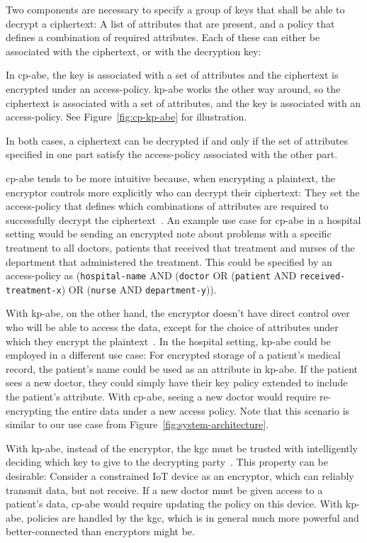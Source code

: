 Two components are necessary to specify a group of keys that shall be able to decrypt a ciphertext:
A list of attributes that are present, and a policy that defines a combination of required attributes. 
Each of these can either be associated with the ciphertext, or with the decryption key:

In \acrfull{cp-abe}, the key is associated with a set of attributes and the ciphertext is encrypted under an \gls{access-policy}.
\acrfull{kp-abe} works the other way around, so the ciphertext is associated with a set of attributes, and the key is associated with an \gls{access-policy}.
See Figure~\ref{fig:cp-kp-abe} for illustration.

In both cases, a ciphertext can be decrypted if and only if the set of attributes specified in one part satisfy the \gls{access-policy} associated with the other part.

\acrshort{cp-abe} tends to be more intuitive because, when encrypting a plaintext, the encryptor controls more explicitly who can decrypt their ciphertext:
They set the \gls{access-policy} that defines which combinations of attributes are required to successfully decrypt the ciphertext~\cite{bethencourt_ciphertext-policy_2007}.
An example use case for \acrshort{cp-abe} in a hospital setting would be sending an encrypted note about problems with a specific treatment to all doctors, patients that received that treatment and nurses of the department that administered the treatment.
This could be specified by an \gls{access-policy} as (\texttt{hospital-name} AND (\texttt{doctor} OR (\texttt{patient} AND \texttt{received-treatment-x}) OR (\texttt{nurse} AND \texttt{department-y})).

With \acrshort{kp-abe}, on the other hand, the encryptor doesn't have direct control over who will be able to access the data, except for the choice of attributes under which they encrypt the plaintext~\cite{bethencourt_ciphertext-policy_2007}.
In the hospital setting, \acrshort{kp-abe} could be employed in a different use case: For encrypted storage of a patient's medical record, the patient's name could be used as an attribute in \acrshort{kp-abe}.
If the patient sees a new doctor, they could simply have their key policy extended to include the patient's attribute.
With \acrshort{cp-abe}, seeing a new doctor would require re-encrypting the entire data under a new access policy.
Note that this scenario is similar to our use case from Figure~\ref{fig:system-architecture}.

With \acrshort{kp-abe}, instead of the encryptor, the \acrlong{kgc} must be trusted with intelligently deciding which key to give to the decrypting party~\cite{bethencourt_ciphertext-policy_2007}.
This property can be desirable: Consider a constrained IoT device as an encryptor, which can reliably transmit data, but not receive.
If a new doctor must be given access to a patient's data, \acrshort{cp-abe} would require updating the policy on this device.
With \acrshort{kp-abe}, policies are handled by the \acrshort{kgc}, which is in general much more powerful and better-connected than encryptors might be.


